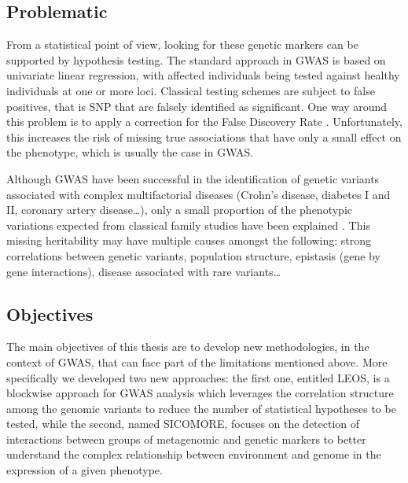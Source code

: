 \documentclass[]{book}
\begin{document}
\hypertarget{problematic}{%
\subsection*{Problematic}\label{problematic}}

From a statistical point of view, looking for these genetic markers can
be supported by hypothesis testing. The standard approach in GWAS is
based on univariate linear regression, with affected individuals being
tested against healthy individuals at one or more loci. Classical
testing schemes are subject to false positives, that is SNP that are
falsely identified as significant. One way around this problem is to
apply a correction for the False Discovery Rate \citep[FDR,][]{benjamini_controlling_1995}. Unfortunately, this increases the risk of
missing true associations that have only a small effect on the
phenotype, which is usually the case in GWAS.

Although GWAS have been successful in the identification of genetic
variants associated with complex multifactorial diseases (Crohn's
disease, diabetes I and II, coronary artery
disease\ldots{}\citep{burton_genome-wide_2007}), only a small proportion of the
phenotypic variations expected from classical family studies have been
explained \citep{manolio_finding_2009}. This missing heritability may have
multiple causes amongst the following: strong correlations between
genetic variants, population structure, epistasis (gene by gene
interactions), disease associated with rare variants\ldots{}

\hypertarget{objectives}{%
\subsection*{Objectives}\label{objectives}}

The main objectives of this thesis are to develop new methodologies, in
the context of GWAS, that can face part of the limitations mentioned
above. More specifically we developed two new approaches: the first one,
entitled LEOS, is a blockwise approach for GWAS analysis which leverages
the correlation structure among the genomic variants to reduce the
number of statistical hypotheses to be tested, while the second, named
SICOMORE, focuses on the detection of interactions between groups of
metagenomic and genetic markers to better understand the complex
relationship between environment and genome in the expression of a given
phenotype.
\end{document}
